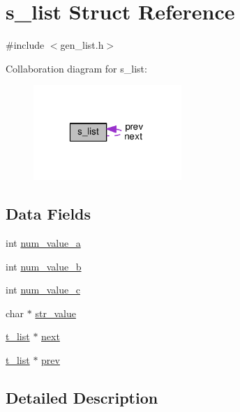 \hypertarget{structs__list}{\section{s\-\_\-list Struct Reference}
\label{structs__list}
}


{\ttfamily \#include $<$gen\-\_\-list.\-h$>$}



Collaboration diagram for s\-\_\-list\-:\nopagebreak
\begin{figure}[H]
\begin{center}
\leavevmode
\includegraphics[width=159pt]{dd/d04/structs__list__coll__graph}
\end{center}
\end{figure}
\subsection*{Data Fields}
\begin{DoxyCompactItemize}
\item 
int \hyperlink{structs__list_a08f6b479f237e672809735f0764104e6}{num\-\_\-value\-\_\-a}
\item 
int \hyperlink{structs__list_a067e0fca9eda0eeac39cd8c6e7fe50c5}{num\-\_\-value\-\_\-b}
\item 
int \hyperlink{structs__list_a6709d69fcc8bb060ac025b812ac45550}{num\-\_\-value\-\_\-c}
\item 
char $\ast$ \hyperlink{structs__list_a50b6bdca20b777174be4fbdb217ca8d6}{str\-\_\-value}
\item 
\hyperlink{gen__list_8h_aefde00352c5326bb1c28ebd4404c4795}{t\-\_\-list} $\ast$ \hyperlink{structs__list_afb31ca295a227d12dae42eb9d7a61f40}{next}
\item 
\hyperlink{gen__list_8h_aefde00352c5326bb1c28ebd4404c4795}{t\-\_\-list} $\ast$ \hyperlink{structs__list_a58d5321b61e8202cbad3ede333207719}{prev}
\end{DoxyCompactItemize}


\subsection{Detailed Description}



